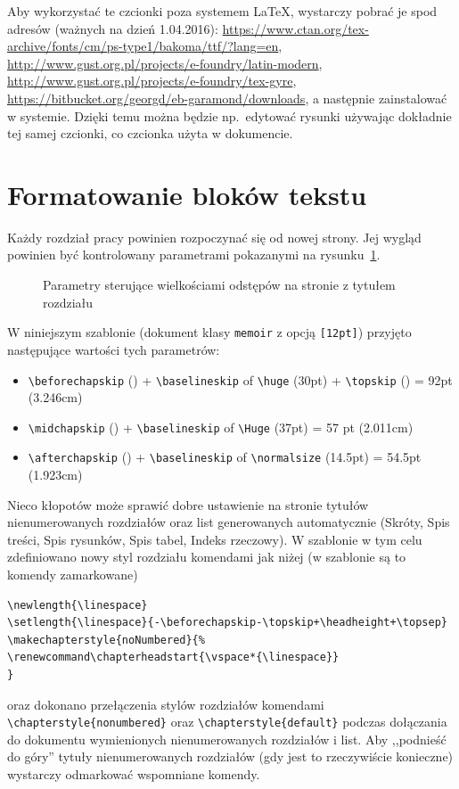 Aby wykorzystać te czcionki poza systemem LaTeX, wystarczy pobrać je spod adresów (ważnych na dzień
1.04.2016): 
\url{https://www.ctan.org/tex-archive/fonts/cm/ps-type1/bakoma/ttf/?lang=en}, \url{http://www.gust.org.pl/projects/e-foundry/latin-modern}, \url{http://www.gust.org.pl/projects/e-foundry/tex-gyre}, \url{https://bitbucket.org/georgd/eb-garamond/downloads},
a następnie zainstalować w systemie. Dzięki temu można będzie np.~edytować rysunki używając dokładnie tej samej czcionki, co czcionka użyta w dokumencie.

\section{Formatowanie bloków tekstu}
Każdy rozdział pracy powinien rozpoczynać się od nowej strony. Jej wygląd powinien być kontrolowany parametrami pokazanymi na rysunku~\ref{fig:LayChap}.
\begin{figure}[t]
\centering
\chapterdiagram
\caption{Parametry sterujące wielkościami odstępów na stronie z tytułem rozdziału} 
\label{fig:LayChap}
\end{figure}
W niniejszym szablonie (dokument klasy \texttt{memoir} z opcją \texttt{[12pt]}) przyjęto następujące wartości tych parametrów:
\begin{itemize}
\item \verb?\beforechapskip? (\printlength{\beforechapskip}) + \verb?\baselineskip? of \verb+\huge+ (30pt) + \verb+\topskip+ (\printlength{\topskip}) = 92pt (3.246cm)
\item \verb?\midchapskip? (\printlength{\midchapskip}) + \verb?\baselineskip? of \verb+\Huge+ (37pt) = 57 pt (2.011cm)
\item \verb?\afterchapskip? (\printlength{\afterchapskip}) + \verb+\baselineskip+ of \verb+\normalsize+ (14.5pt) = 54.5pt (1.923cm)
\end{itemize}

Nieco kłopotów może sprawić dobre ustawienie na stronie tytułów nienumerowanych rozdziałów oraz list generowanych automatycznie (Skróty, Spis treści, Spis rysunków, Spis tabel, Indeks rzeczowy). W szablonie w tym celu zdefiniowano nowy styl rozdziału komendami jak niżej (w szablonie są to komendy zamarkowane)
\begin{lstlisting}[basicstyle=\footnotesize\ttfamily]
\newlength{\linespace}
\setlength{\linespace}{-\beforechapskip-\topskip+\headheight+\topsep}
\makechapterstyle{noNumbered}{%
\renewcommand\chapterheadstart{\vspace*{\linespace}}
}
\end{lstlisting}
oraz dokonano przełączenia stylów rozdziałów komendami \verb?\chapterstyle{nonumbered}? oraz \verb?\chapterstyle{default}? podczas dołączania do dokumentu wymienionych nienumerowanych rozdziałów i list. Aby ,,podnieść do góry'' tytuły nienumerowanych rozdziałów (gdy jest to rzeczywiście konieczne) wystarczy odmarkować wspomniane komendy.


